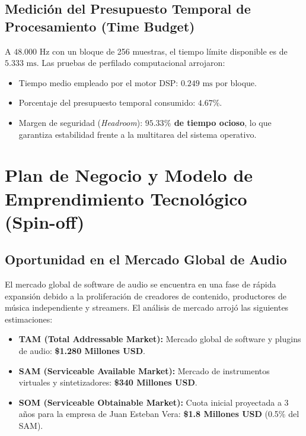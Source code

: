 \documentclass[11pt,a4paper]{article}
\begin{document}
\subsection{Medición del Presupuesto Temporal de Procesamiento (Time Budget)}
A $48.000\text{ Hz}$ con un bloque de 256 muestras, el tiempo límite disponible es de $5.333\text{ ms}$. Las pruebas de perfilado computacional arrojaron:
\begin{itemize}
    \item Tiempo medio empleado por el motor DSP: \textbf{$0.249\text{ ms}$} por bloque.
    \item Porcentaje del presupuesto temporal consumido: \textbf{$4.67\%$}.
    \item Margen de seguridad (\textit{Headroom}): \textbf{$95.33\%$ de tiempo ocioso}, lo que garantiza estabilidad frente a la multitarea del sistema operativo.
\end{itemize}

\section{Plan de Negocio y Modelo de Emprendimiento Tecnológico (Spin-off)}

\subsection{Oportunidad en el Mercado Global de Audio}
El mercado global de software de audio se encuentra en una fase de rápida expansión debido a la proliferación de creadores de contenido, productores de música independiente y streamers. El análisis de mercado arrojó las siguientes estimaciones:
\begin{itemize}
    \item \textbf{TAM (Total Addressable Market):} Mercado global de software y plugins de audio: \textbf{\$1.280 Millones USD}.
    \item \textbf{SAM (Serviceable Available Market):} Mercado de instrumentos virtuales y sintetizadores: \textbf{\$340 Millones USD}.
    \item \textbf{SOM (Serviceable Obtainable Market):} Cuota inicial proyectada a 3 años para la empresa de Juan Esteban Vera: \textbf{\$1.8 Millones USD} (0.5\% del SAM).
\end{itemize}
\end{document}
